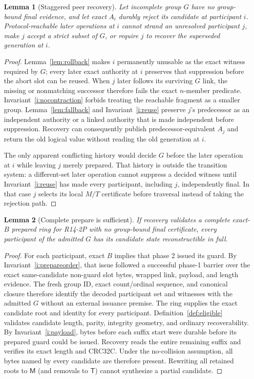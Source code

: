 \documentclass[10pt,twocolumn]{article}
\newtheorem{lemma}{Lemma}
\theoremstyle{remark}
\newcommand{\Materialized}{\mathsf{M}}
\newcommand{\Tombstone}{\mathsf{T}}
\begin{document}
\begin{lemma}[Staggered peer recovery]\label{lem:staggered}
Let incomplete group $G$ have no group-bound final evidence, and let exact $A_i$ durably reject its
candidate at participant $i$. Protocol-reachable later operations at $i$ cannot strand an unresolved
participant $j$, make $j$ accept a strict subset of $G$, or require $j$ to recover the superseded
generation at $i$.
\end{lemma}
\begin{proof}
Lemma~\ref{lem:rollback} makes $i$ permanently unusable as the exact witness required by $G$; every
later exact authority at $i$ preserves that suppression before the abort slot can be reused. When
$j$ later follows its surviving $G$ link, the missing or nonmatching successor therefore fails the
exact $n$-member predicate. Invariant~\ref{i:nocontraction} forbids treating the reachable fragment
as a smaller group. Lemma~\ref{lem:fallback} and Invariant~\ref{i:reuse} preserve $j$'s predecessor
as an independent authority or a linked authority that is made independent before suppression.
Recovery can consequently publish predecessor-equivalent $A_j$ and return the old logical value
without reading the old generation at $i$.

The only apparent conflicting history would decide $G$ before the later operation at $i$ while
leaving $j$ merely prepared. That history is outside the transition system: a different-set later
operation cannot suppress a decided witness until Invariant~\ref{i:reuse} has made every participant,
including $j$, independently final. In that case $j$ selects its local $M/T$ certificate before
traversal instead of taking the rejection path.
\end{proof}

\begin{lemma}[Complete prepare is sufficient]\label{lem:complete}
If recovery validates a complete exact-$B$ prepared ring for R14-2P with no group-bound final
certificate, every participant of the admitted $G$ has its candidate state reconstructible in full.
\end{lemma}
\begin{proof}
For each participant, exact $B$ implies that phase 2 issued its guard. By
Invariant~\ref{i:prepareorder}, that issue followed a successful phase-1 barrier over the exact
same-candidate non-guard slot bytes, wrapped link, payload, and length evidence. The fresh group ID,
exact count/ordinal sequence, and canonical closure therefore identify the decoded participant set
and witnesses with the admitted $G$ without an external issuance premise. The ring supplies the
exact candidate root and identity for every participant.
Definition~\ref{def:eligible} validates candidate length, parity, integrity geometry, and ordinary
recoverability. By Invariant~\ref{i:payload}, bytes
before each suffix start were durable before its prepared guard could be issued. Recovery reads
the entire remaining suffix and verifies its exact length and CRC32C. Under the no-collision
assumption, all bytes named by every candidate are therefore present. Rewriting all retained roots
to $\Materialized$ (and removals to $\Tombstone$) cannot synthesize a partial candidate.
\end{proof}
\end{document}
